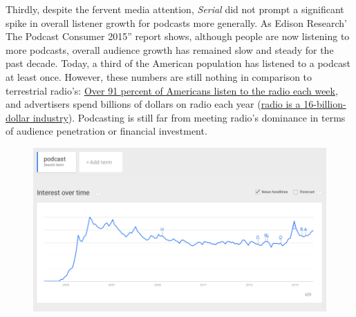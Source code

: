 \documentclass[notoc, symmetric, nobib, nols]{towcenter-guideto-book}
\begin{document}
Thirdly, despite the fervent media attention, \textit{Serial} did not prompt a significant spike in overall listener growth for podcasts more generally. As Edison Research' The Podcast Consumer 2015'' report shows, although people are now listening to more podcasts, overall audience growth has remained slow and steady for the past decade. Today, a third of the American population has listened to a podcast at least once.\autocite{EdPCconsumer} However, these numbers are still nothing in comparison to terrestrial radio's: \href{http://www.nielsen.com/us/en/insights/reports/2015/state-of-the-media-audio-today-how-america-listens.html}{Over 91 percent of Americans listen to the radio each week}, and advertisers spend billions of dollars on radio each year (\href{http://www.statista.com/topics/1330/radio/}{radio is a 16-billion-dollar industry}).\autocites{nielsenradio, statistaradio} Podcasting is still far from meeting radio's dominance in terms of audience penetration or financial investment.

\begin{figure}
\begin{centering}
\includegraphics[width=.9\textwidth]{graphics/PODCAST15_Trends_podcast.png}
\caption{} 
\end{centering}
\end{figure}
\end{document}

